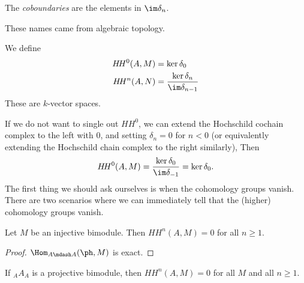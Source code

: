 \documentclass[a4paper]{article}
\newcommand\HH{H\!H}
\begin{document}
\begin{defi}[Coboundaries]
  The \emph{coboundaries} are the elements in $\im \delta_n$.
\end{defi}
These names came from algebraic topology.

\begin{defi}\index{$\HH^n(A, M)$}
  We define
  \begin{align*}
    \HH^0(A, M) &= \ker \delta_0\\
    \HH^n(A, N) &= \frac{\ker \delta_n}{\im \delta_{n - 1}}
  \end{align*}
  These are $k$-vector spaces.
\end{defi}
If we do not want to single out $\HH^0$, we can extend the Hochschild cochain complex to the left with $0$, and setting $\delta_n = 0$ for $n < 0$ (or equivalently extending the Hochschild chain complex to the right similarly), Then
\[
  \HH^0(A, M) = \frac{\ker \delta_0}{\im \delta_{-1}} = \ker \delta_0.
\]
The first thing we should ask ourselves is when the cohomology groups vanish. There are two scenarios where we can immediately tell that the (higher) cohomology groups vanish.

\begin{lemma}
  Let $M$ be an injective bimodule. Then $\HH^n(A, M) = 0$ for all $n \geq 1$.
\end{lemma}

\begin{proof}
  $\Hom_{A\mdash A}(\ph, M)$ is exact.
\end{proof}

\begin{lemma}
  If $_AA_A$ is a projective bimodule, then $\HH^n(A, M) = 0$ for all $M$ and all $n \geq 1$.
\end{lemma}
\end{document}
